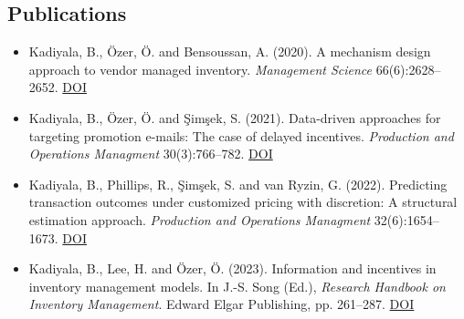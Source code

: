\documentclass[11pt]{article}
\begin{document}
	\subsection*{Publications}

	\begin{itemize}
		\item Kadiyala, B., \"Ozer, \"O. and Bensoussan, A. (2020).  A mechanism design approach to vendor managed inventory.	\textit{Management Science} 66(6):2628--2652.	 \href{https://doi.org/10.1287/mnsc.2019.3297}{DOI}
		\item Kadiyala, B., \"Ozer, \"O. and \c{S}im\c{s}ek, S. (2021). Data-driven approaches for targeting promotion e-mails: The case of delayed incentives. \textit{Production and Operations Managment} 30(3):766--782. \href{https://doi.org/10.1111/poms.13316}{DOI}
		\item Kadiyala, B., Phillips, R., \c{S}im\c{s}ek, S. and van Ryzin, G. (2022). Predicting transaction outcomes under customized pricing with discretion: A structural estimation approach. \textit{Production and Operations Managment}  32(6):1654--1673. \href{https://doi.org/10.1111/poms.13931}{DOI}
		\item  Kadiyala, B., Lee, H. and \"Ozer, \"O. (2023).  Information and incentives in inventory management models.  In J.-S.  Song (Ed.),  \textit{Research Handbook on Inventory Management}. Edward Elgar Publishing, pp. 261--287. \href{https://doi.org/10.4337/9781800377103.00020}{DOI}


\end{itemize}
\end{document}
